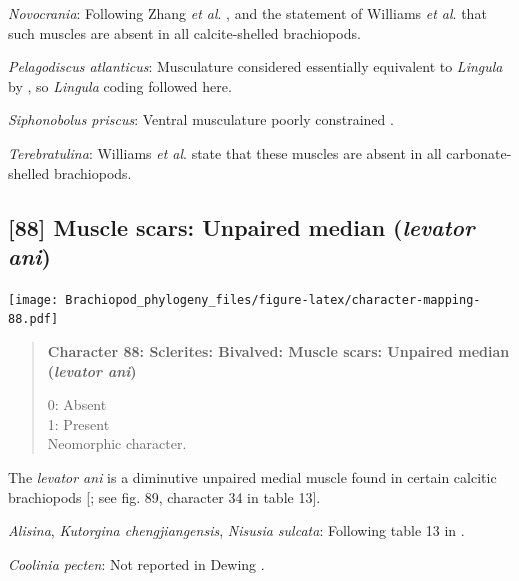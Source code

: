 \documentclass[openany]{book}
\begin{document}
\hypertarget{Novocrania-coding-87}{}
\emph{Novocrania}: Following Zhang \emph{et al}.
\citeyearpar{Zhang2014Anearly}, and the statement of Williams \emph{et
al}. \citeyearpar{Williams2000LinguliformeaCraniiformea} that such
muscles are absent in all calcite-shelled brachiopods.

\hypertarget{Pelagodiscus_atlanticus-coding-87}{}
\emph{Pelagodiscus atlanticus}: Musculature considered essentially
equivalent to \emph{Lingula} by
\citet{Williams2000LinguliformeaCraniiformea}, so \emph{Lingula} coding
followed here.

\hypertarget{Siphonobolus_priscus-coding-87}{}
\emph{Siphonobolus priscus}: Ventral musculature poorly constrained
\citep{Williams2000LinguliformeaCraniiformea, Popov2009Earlyontogeny}.

\hypertarget{Terebratulina-coding-87}{}
\emph{Terebratulina}: Williams \emph{et al}.
\citeyearpar[p.~32]{Williams2000LinguliformeaCraniiformea} state that
these muscles are absent in all carbonate-shelled brachiopods.

\subsection*{\texorpdfstring{{[}88{]} Muscle scars: Unpaired median
(\emph{levator
ani})}{{[}88{]} Muscle scars: Unpaired median (levator ani)}}\label{muscle-scars-unpaired-median-levator-ani}

\texttt{[image: Brachiopod\_phylogeny\_files/figure-latex/character-mapping-88.pdf]}

\begin{quote}
\textbf{Character 88: Sclerites: Bivalved: Muscle scars: Unpaired median
(\emph{levator ani})}

0: Absent\\
1: Present\\
Neomorphic character.
\end{quote}

The \emph{levator ani} is a diminutive unpaired medial muscle found in
certain calcitic brachiopods
{[}\citet{Williams2000LinguliformeaCraniiformea}; see fig. 89, character
34 in table 13{]}.

\hypertarget{Alisina-coding-88}{}
\emph{Alisina}, \emph{Kutorgina chengjiangensis}, \emph{Nisusia
sulcata}: Following table 13 in
\citet{Williams2000LinguliformeaCraniiformea}.

\hypertarget{Coolinia_pecten-coding-88}{}
\emph{Coolinia pecten}: Not reported in Dewing
\citeyearpar{Dewing2001Hingemodifications}.
\end{document}
